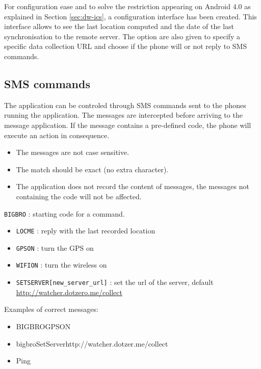 For configuration ease and to solve the restriction appearing on Android 4.0 as explained in Section \ref{sec:dw-ics}, a configuration interface has been created.
This interface allows to see the last location computed and the date of the last synchronisation to the remote server.
The option are also given to specify a specific data collection URL and choose if the phone will or not reply to SMS commands.

\subsection{SMS commands}
\label{sec:dw-smscom}

The application can be controled through SMS commands sent to the phones running the application.
The messages are intercepted before arriving to the message application.
If the message contains a pre-defined code, the phone will execute an action in consequence.

\begin{itemize}
\item The messages are not case sensitive.
\item The match should be exact (no extra character).
\item The application does not record the content of messages, the messages not containing the code will not be affected.
\end{itemize}

\vspace{0.5cm}
\texttt{BIGBRO} : starting code for a command.
\begin{itemize}
\item \texttt{LOCME} : reply with the last recorded location
\item \texttt{GPSON} : turn the GPS on
\item \texttt{WIFION} : turn the wireless on
\item \texttt{SETSERVER[new\_server\_url]} : set
  the url of the server, default
  \url{http://watcher.dotzero.me/collect}
\end{itemize}

\vspace{0.5cm}
Examples of correct messages:
\begin{itemize}
\item BIGBROGPSON
\item bigbroSetServerhttp://watcher.dotzer.me/collect
\item Ping
\end{itemize}

